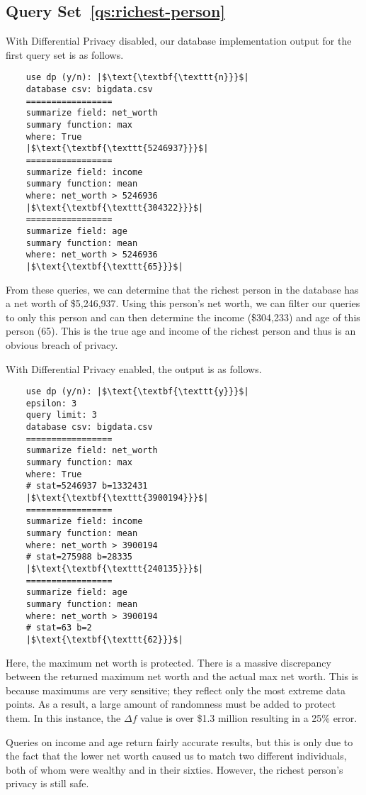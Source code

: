 \documentclass[conference,11pt]{IEEEtran}
\begin{document}
\subsection{Query Set~\ref{qs:richest-person}}
With Differential Privacy disabled, our database implementation output for the
first query set is as follows.
\begin{verbatim}
    use dp (y/n): |$\text{\textbf{\texttt{n}}}$|
    database csv: bigdata.csv
    =================
    summarize field: net_worth
    summary function: max
    where: True
    |$\text{\textbf{\texttt{5246937}}}$|
    =================
    summarize field: income
    summary function: mean
    where: net_worth > 5246936
    |$\text{\textbf{\texttt{304322}}}$|
    =================
    summarize field: age
    summary function: mean
    where: net_worth > 5246936
    |$\text{\textbf{\texttt{65}}}$|
\end{verbatim}
From these queries, we can determine that the richest person in the database has
a net worth of \$5,246,937. Using this person's net worth, we can filter our
queries to only this person and can then determine the income (\$304,233) and
age of this person (65). This is the true age and income of the richest person
and thus is an obvious breach of privacy.

With Differential Privacy enabled, the output is as follows.
\begin{verbatim}
    use dp (y/n): |$\text{\textbf{\texttt{y}}}$|
    epsilon: 3
    query limit: 3
    database csv: bigdata.csv
    =================
    summarize field: net_worth
    summary function: max
    where: True
    # stat=5246937 b=1332431
    |$\text{\textbf{\texttt{3900194}}}$|
    =================
    summarize field: income
    summary function: mean
    where: net_worth > 3900194
    # stat=275988 b=28335
    |$\text{\textbf{\texttt{240135}}}$|
    =================
    summarize field: age
    summary function: mean
    where: net_worth > 3900194
    # stat=63 b=2
    |$\text{\textbf{\texttt{62}}}$|
\end{verbatim}
Here, the maximum net worth is protected. There is a massive discrepancy between
the returned maximum net worth and the actual max net worth. This is because
maximums are very sensitive; they reflect only the most extreme data points. As
a result, a large amount of randomness must be added to protect them.  In this
instance, the $\Delta f$ value is over \$1.3 million resulting in a 25\% error.

Queries on income and age return fairly accurate results, but this is only due
to the fact that the lower net worth caused us to match two different
individuals, both of whom were wealthy and in their sixties. However, the
richest person's privacy is still safe.
\end{document}
